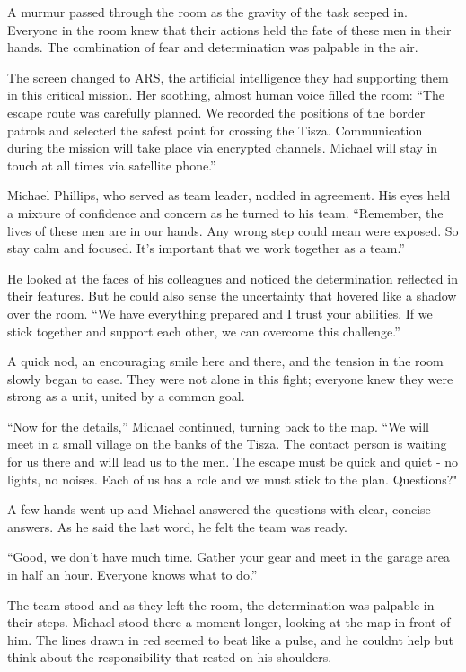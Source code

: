 \documentclass[
]{article}
\begin{document}
A murmur passed through the room as the gravity of the task seeped in.
Everyone in the room knew that their actions held the fate of these men
in their hands. The combination of fear and determination was palpable
in the air.

The screen changed to ARS, the artificial intelligence they had
supporting them in this critical mission. Her soothing, almost human
voice filled the room: ``The escape route was carefully planned. We
recorded the positions of the border patrols and selected the safest
point for crossing the Tisza. Communication during the mission will take
place via encrypted channels. Michael will stay in touch at all times
via satellite phone.''

Michael Phillips, who served as team leader, nodded in agreement. His
eyes held a mixture of confidence and concern as he turned to his team.
``Remember, the lives of these men are in our hands. Any wrong step
could mean we\textquotesingle re exposed. So stay calm and focused. It's
important that we work together as a team.''

He looked at the faces of his colleagues and noticed the determination
reflected in their features. But he could also sense the uncertainty
that hovered like a shadow over the room. ``We have everything prepared
and I trust your abilities. If we stick together and support each other,
we can overcome this challenge.''

A quick nod, an encouraging smile here and there, and the tension in the
room slowly began to ease. They were not alone in this fight; everyone
knew they were strong as a unit, united by a common goal.

``Now for the details,'' Michael continued, turning back to the map.
``We will meet in a small village on the banks of the Tisza. The contact
person is waiting for us there and will lead us to the men. The escape
must be quick and quiet - no lights, no noises. Each of us has a role
and we must stick to the plan. Questions?"

A few hands went up and Michael answered the questions with clear,
concise answers. As he said the last word, he felt the team was ready.

``Good, we don't have much time. Gather your gear and meet in the garage
area in half an hour. Everyone knows what to do.''

The team stood and as they left the room, the determination was palpable
in their steps. Michael stood there a moment longer, looking at the map
in front of him. The lines drawn in red seemed to beat like a pulse, and
he couldn\textquotesingle t help but think about the responsibility that
rested on his shoulders.
\end{document}
